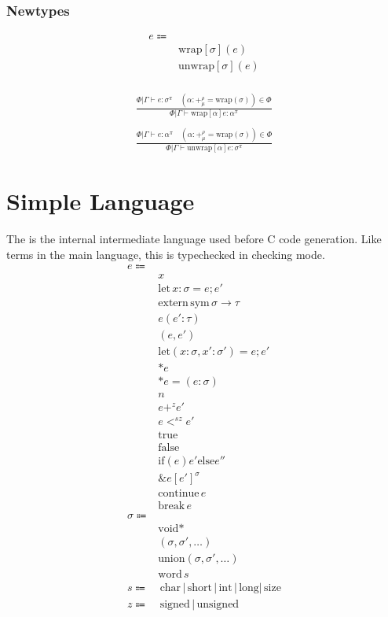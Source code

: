\documentclass {article}
\begin{document}
\subsubsection{Newtypes}

\begin{align*}
e \Coloneqq & \\
& \text{wrap} [\sigma] (e) \\
& \text{unwrap} [\sigma] (e) \\
\end{align*}

\begin{gather*}
\frac
{\Phi | \Gamma \vdash e : \sigma^\pi \quad (\alpha : +^\rho_\mu = \text{wrap} (\sigma)) \in \Phi}
{\Phi | \Gamma \vdash \text{wrap} [\alpha] e : \alpha^\pi} \\
\\
\frac
{\Phi | \Gamma \vdash e : \alpha^\pi \quad (\alpha : +^\rho_\mu = \text{wrap} (\sigma)) \in \Phi}
{\Phi | \Gamma \vdash \text{unwrap} [\alpha] e : \sigma^\pi}
\end{gather*}

\section{Simple Language}
The is the internal intermediate language used before C code generation.
Like terms in the main language, this is typechecked in checking mode.
\begin{align*}
e \Coloneqq & \\
& x \\
& \text{let} \, x : \sigma = e; e' \\
& \text{extern} \, \text{sym} \, \sigma \to \tau \\
& e(e' : \tau) \\
& (e,e') \\
& \text{let} (x: \sigma, x' : \sigma') = e; e' \\
& * e \\
& * e = (e : \sigma) \\
& n \\
& e +^z e' \\
& e <^{sz} e' \\
& \text{true} \\
& \text{false} \\
& \text{if} (e) {e'} \text{else} {e''} \\
& \&e[e']^\sigma \\
& \text{continue} \, e \\
& \text{break} \, e \\
\sigma \Coloneqq & \\
& \text{void}* \\ 
& (\sigma, \sigma', \dots) \\
& \text{union} (\sigma, \sigma', \dots) \\
& \text{word} \, s \\
s \Coloneqq & \, \text{char} \, | \, \text{short} \, | \, \text{int} \, | \, \text{long} | \, \text{size} \\
z \Coloneqq & \, \text{signed} \, | \, \text{unsigned}
\end{align*}
\end{document}

